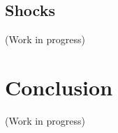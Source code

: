 \documentclass[12pt]{article}
\begin{document}
\begin{spacing}{1.5}
\subsection{Shocks}

(Work in progress)

\section{Conclusion}


(Work in progress)




\end{spacing}


\pagebreak




\nocite{*}
\end{document}
